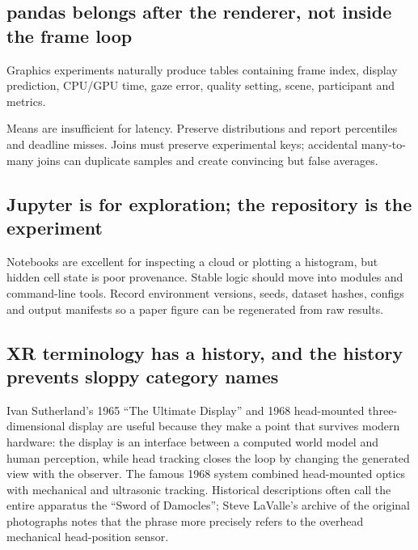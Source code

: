 \subsection{pandas belongs after the renderer, not inside the frame loop}\label{04-visual-computing-ii-ch035-pandas-belongs-after-the-renderer-not-inside-the-frame-loop}

\hypertarget{04-visual-computing-ii-ch035-pandas-belongs-after-the-renderer-not-inside-the-frame-loop}{}

Graphics experiments naturally produce tables containing frame index, display prediction, CPU/GPU time, gaze error, quality setting, scene, participant and metrics.

Means are insufficient for latency. Preserve distributions and report percentiles and deadline misses. Joins must preserve experimental keys; accidental many-to-many joins can duplicate samples and create convincing but false averages.

\subsection{Jupyter is for exploration; the repository is the experiment}\label{04-visual-computing-ii-ch035-jupyter-is-for-exploration-the-repository-is-the-experiment}

\hypertarget{04-visual-computing-ii-ch035-jupyter-is-for-exploration-the-repository-is-the-experiment}{}

Notebooks are excellent for inspecting a cloud or plotting a histogram, but hidden cell state is poor provenance. Stable logic should move into modules and command-line tools. Record environment versions, seeds, dataset hashes, configs and output manifests so a paper figure can be regenerated from raw results.

\subsection{XR terminology has a history, and the history prevents sloppy category names}\label{04-visual-computing-ii-ch035-xr-terminology-has-a-history-and-the-history-prevents-sloppy-category-names}

\hypertarget{04-visual-computing-ii-ch035-xr-terminology-has-a-history-and-the-history-prevents-sloppy-category-names}{}

Ivan Sutherland's 1965 ``The Ultimate Display'' and 1968 head-mounted three-dimensional display are useful because they make a point that survives modern hardware: the display is an interface between a computed world model and human perception, while head tracking closes the loop by changing the generated view with the observer. The famous 1968 system combined head-mounted optics with mechanical and ultrasonic tracking. Historical descriptions often call the entire apparatus the ``Sword of Damocles''; Steve LaValle's archive of the original photographs notes that the phrase more precisely refers to the overhead mechanical head-position sensor.

